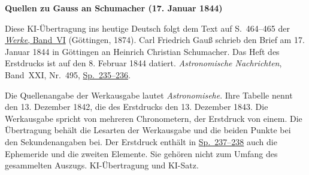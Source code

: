 \clearpage\thispagestyle{empty}
\begin{center}\textbf{Quellen zu Gauss an Schumacher (17. Januar 1844)}\end{center}
\noindent Diese KI-Übertragung ins heutige Deutsch folgt dem Text auf S.~464--465 der \href{https://gdz.sub.uni-goettingen.de/id/PPN236007467}{\textit{Werke}, Band~VI} (Göttingen, 1874). Carl Friedrich Gauß schrieb den Brief am 17. Januar 1844 in Göttingen an Heinrich Christian Schumacher. Das Heft des Erstdrucks ist auf den 8. Februar 1844 datiert. \textit{Astronomische Nachrichten}, Band~XXI, Nr.~495, \href{https://api.digitale-sammlungen.de/iiif/image/v2/bsb10049446_00126/full/1800,/0/default.jpg}{Sp.~235--236}.
\par\smallskip\noindent Die Quellenangabe der Werkausgabe lautet \textit{Astronomisehe}. Ihre Tabelle nennt den 13. Dezember 1842, die des Erstdrucks den 13. Dezember 1843. Die Werkausgabe spricht von mehreren Chronometern, der Erstdruck von einem. Die Übertragung behält die Lesarten der Werkausgabe und die beiden Punkte bei den Sekundenangaben bei. Der Erstdruck enthält in \href{https://api.digitale-sammlungen.de/iiif/image/v2/bsb10049446_00127/full/1800,/0/default.jpg}{Sp.~237--238} auch die Ephemeride und die zweiten Elemente. Sie gehören nicht zum Umfang des gesammelten Auszugs. KI-Übertragung und KI-Satz.
\clearpage
